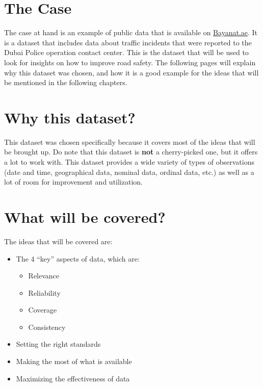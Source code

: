 \documentclass[
]{book}
\providecommand{\tightlist}{%
  \setlength{\itemsep}{0pt}\setlength{\parskip}{0pt}}
\begin{document}
\hypertarget{the-case}{%
\section{The Case}\label{the-case}}

The case at hand is an example of public data that is available on \href{https://bayanat.ae}{Bayanat.ae}. It is a dataset that includes data about traffic incidents that were reported to the Dubai Police operation contact center. This is the dataset that will be used to look for insights on how to improve road safety. The following pages will explain why this dataset was chosen, and how it is a good example for the ideas that will be mentioned in the following chapters.

\hypertarget{why-this-dataset}{%
\section{Why this dataset?}\label{why-this-dataset}}

This dataset was chosen specifically because it covers most of the ideas that will be brought up. Do note that this dataset is \textbf{not} a cherry-picked one, but it offers a lot to work with. This dataset provides a wide variety of types of observations (date and time, geographical data, nominal data, ordinal data, etc.) as well as a lot of room for improvement and utilization.

\hypertarget{what-will-be-covered}{%
\section{What will be covered?}\label{what-will-be-covered}}

The ideas that will be covered are:

\begin{itemize}
\tightlist
\item
  The 4 ``key'' aspects of data, which are:

  \begin{itemize}
  \tightlist
  \item
    Relevance
  \item
    Reliability
  \item
    Coverage
  \item
    Consistency
  \end{itemize}
\item
  Setting the right standards
\item
  Making the most of what is available
\item
  Maximizing the effectiveness of data
\end{itemize}
\end{document}
